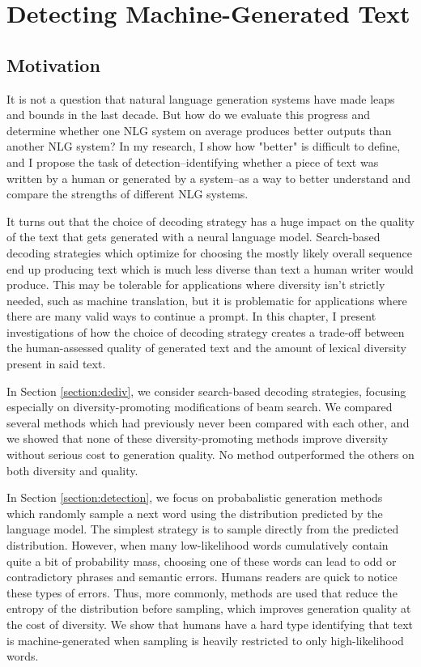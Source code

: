 \chapter{Detecting Machine-Generated Text}
\label{chap:decoding}

\section{Motivation}
It is not a question that natural language generation systems have made leaps and bounds in the last decade.
But how do we evaluate this progress and determine whether one NLG system on average produces better outputs than another NLG system?
In my research, I show how "better" is difficult to define, and I propose the task of detection--identifying whether a piece of text was written by a human or generated by a system--as a way to better understand and compare the strengths of different NLG systems. 

It turns out that the choice of decoding strategy has a huge impact on the quality of the text that gets generated with a neural language model.
Search-based decoding strategies which optimize for choosing the mostly likely overall sequence end up producing text which is much less diverse than text a human writer would produce.
This may be tolerable for applications where diversity isn't strictly needed, such as machine translation, but it is problematic for applications where there are many valid ways to continue a prompt.
In this chapter, I present investigations of how the choice of decoding strategy creates a trade-off between the human-assessed quality of generated text and the amount of lexical diversity present in said text.

In Section \ref{section:dediv}, we consider search-based decoding strategies, focusing especially on diversity-promoting modifications of beam search.
We compared several methods which had previously never been compared with each other, and we showed that none of these diversity-promoting methods improve diversity without serious cost to generation quality.
No method outperformed the others on both diversity and quality.

In Section \ref{section:detection}, we focus on probabalistic generation methods which randomly sample a next word using the distribution predicted by the language model.
The simplest strategy is to sample directly from the predicted distribution.
However, when many low-likelihood words cumulatively contain quite a bit of probability mass, choosing one of these words can lead to odd or contradictory phrases and semantic errors.
Humans readers are quick to notice these types of errors.
Thus, more commonly, methods are used that reduce the entropy of the distribution before sampling, which improves generation quality at the cost of diversity.
We show that humans have a hard type identifying that text is machine-generated when sampling is heavily restricted to only high-likelihood words.

